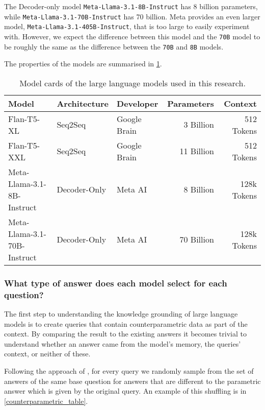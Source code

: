 The Decoder-only model \texttt{Meta-Llama-3.1-8B-Instruct} has 8 billion parameters, while \texttt{Meta-Llama-3.1-70B-Instruct} has 70 billion.
Meta provides an even larger model, \texttt{Meta-Llama-3.1-405B-Instruct}, that is too large to easily experiment with.
However, we expect the difference between this model and the \texttt{70B} model to be roughly the same as the difference between the \texttt{70B} and \texttt{8B} models.

The properties of the models are summarised in \cref{model_card}.

\begin{table}[htbp]
	\centering
	\footnotesize
	\begin{tabular}{>{\ttfamily}l l l r r}
		\toprule
			\rmfamily \bfseries Model & \bfseries Architecture & \bfseries Developer & \bfseries Parameters & \bfseries Context \\
		\midrule
			Flan-T5-XL & Seq2Seq & Google Brain & 3 Billion & 512 Tokens \\
			Flan-T5-XXL & Seq2Seq & Google Brain & 11 Billion & 512 Tokens \\
			Meta-Llama-3.1-8B-Instruct & Decoder-Only & Meta AI & 8 Billion & 128k Tokens \\
			Meta-Llama-3.1-70B-Instruct & Decoder-Only & Meta AI & 70 Billion & 128k Tokens \\
		\bottomrule
	\end{tabular}
	\caption{Model cards of the large language models used in this research.}
	\label{model_card}
\end{table}

\subsubsection{What type of answer does each model select for each question?}
\label{methodology_type_of_answer}

The first step to understanding the knowledge grounding of large language models is to create queries that contain counterparametric data as part of the context.
By comparing the result to the existing answers it becomes trivial to understand whether an answer came from the model's memory, the queries' context, or neither of these.

Following the approach of \citeauthor{factual_recall}, for every query we randomly sample from the set of answers of the same base question for answers that are different to the parametric answer which is given by the original query.
An example of this shuffling is in \cref{counterparametric_table}.

